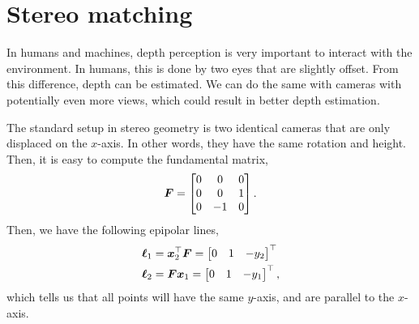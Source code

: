 \section{Stereo matching}

In humans and machines, depth perception is very important to interact with the
environment. In humans, this is done by two eyes that are slightly offset. From
this difference, depth can be estimated. We can do the same with cameras with
potentially even more views, which could result in better depth estimation.


The standard setup in stereo geometry is two identical cameras that are only
displaced on the $x$-axis. In other words, they have the same rotation and
height. Then, it is easy to compute the fundamental matrix, \[
  \bm{F} = \begin{bmatrix} 0 & 0 & 0 \\ 0 & 0 & 1 \\ 0 & -1 & 0 \end{bmatrix}
.\]
Then, we have the following epipolar lines,
\begin{align*}
  \bm{\ell}_1 &= \bm{x}_2^\top \bm{F} = \begin{bmatrix} 0 & 1 & -y_2 \end{bmatrix}^\top \\
  \bm{\ell}_2 &= \bm{F} \bm{x}_1 = \begin{bmatrix} 0 & 1 & -y_1 \end{bmatrix}^\top
,\end{align*}
which tells us that all points will have the same $y$-axis, and are parallel to
the $x$-axis.

